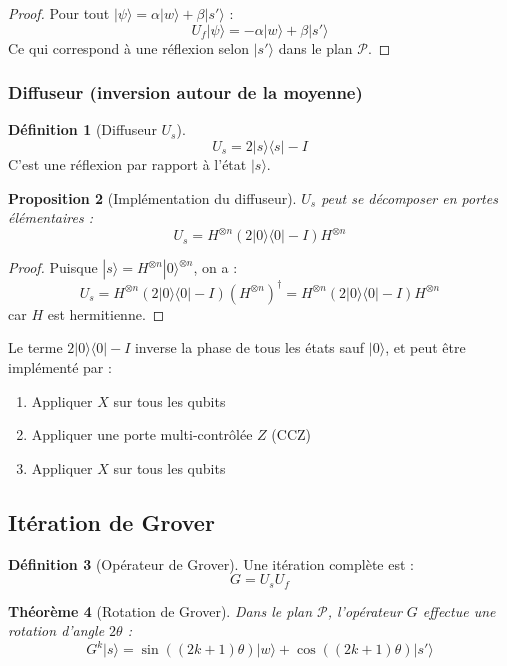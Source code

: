 \documentclass[12pt,a4paper]{article}
\newtheorem{theorem}{Théorème}[section]
\newtheorem{proposition}[theorem]{Proposition}
\theoremstyle{definition}
\newtheorem{definition}[theorem]{Définition}
\theoremstyle{remark}
\begin{document}
\begin{proof}
Pour tout $|\psi\rangle = \alpha|w\rangle + \beta|s'\rangle$ :
\[
U_f|\psi\rangle = -\alpha|w\rangle + \beta|s'\rangle
\]
Ce qui correspond à une réflexion selon $|s'\rangle$ dans le plan $\mathcal{P}$.
\end{proof}

\subsubsection{Diffuseur (inversion autour de la moyenne)}

\begin{definition}[Diffuseur $U_s$]
\[
U_s = 2|s\rangle\langle s| - I
\]
C'est une réflexion par rapport à l'état $|s\rangle$.
\end{definition}

\begin{proposition}[Implémentation du diffuseur]
$U_s$ peut se décomposer en portes élémentaires :
\[
U_s = H^{\otimes n} \left(2|0\rangle\langle 0| - I\right) H^{\otimes n}
\]
\end{proposition}

\begin{proof}
Puisque $|s\rangle = H^{\otimes n}|0\rangle^{\otimes n}$, on a :
\[
U_s = H^{\otimes n} (2|0\rangle\langle 0| - I) (H^{\otimes n})^\dagger = H^{\otimes n} (2|0\rangle\langle 0| - I) H^{\otimes n}
\]
car $H$ est hermitienne.
\end{proof}

Le terme $2|0\rangle\langle 0| - I$ inverse la phase de tous les états sauf $|0\rangle$, et peut être implémenté par :
\begin{enumerate}
    \item Appliquer $X$ sur tous les qubits
    \item Appliquer une porte multi-contrôlée $Z$ (CCZ)
    \item Appliquer $X$ sur tous les qubits
\end{enumerate}

\subsection{Itération de Grover}

\begin{definition}[Opérateur de Grover]
Une itération complète est :
\[
G = U_s U_f
\]
\end{definition}

\begin{theorem}[Rotation de Grover]
Dans le plan $\mathcal{P}$, l'opérateur $G$ effectue une rotation d'angle $2\theta$ :
\[
G^k |s\rangle = \sin((2k+1)\theta) |w\rangle + \cos((2k+1)\theta) |s'\rangle
\]
\end{theorem}
\end{document}
